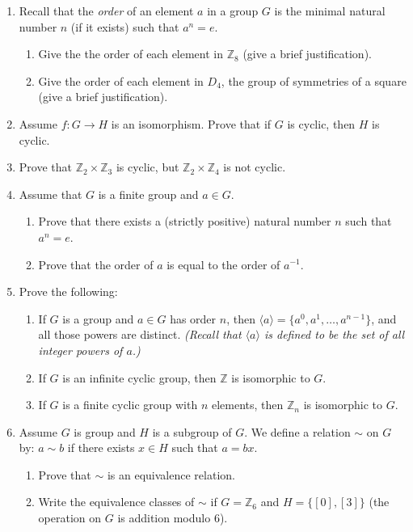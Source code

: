 \documentclass{amsart}
\theoremstyle{definition}
\begin{document}
\begin{enumerate}


\item Recall that the \emph{order} of an element $a$ in a group $G$ is the minimal natural number $n$ (if it exists) such that $a^n = e$.
  \begin{enumerate}
  \item Give the the order of each element in $\mathbb{Z}_{8}$ (give a brief justification).
  \item Give the order of each element in $D_4$, the group of symmetries of a square (give a brief justification).
  \end{enumerate}
\item Assume $f: G \to H$ is an isomorphism. Prove that if $G$ is cyclic, then $H$ is cyclic.
\item Prove that $\mathbb{Z}_2 \times \mathbb{Z}_3$ is cyclic, but $\mathbb{Z}_2 \times \mathbb{Z}_4$ is not cyclic.
\item Assume that $G$ is a finite group and $a \in G$.
  \begin{enumerate}
  \item Prove that there exists a (strictly positive) natural number $n$ such that $a^n = e$.
  \item Prove that the order of $a$ is equal to the order of $a^{-1}$.
  \end{enumerate}

\item Prove the following:

  \begin{enumerate}
  \item If $G$ is a group and $a \in G$ has order $n$, then $\langle a \rangle = \{a^0, a^1, \ldots, a^{n - 1}\}$, and all those powers are distinct. \emph{(Recall that $\langle a \rangle$ is defined to be the set of all integer powers of $a$.)}
  \item If $G$ is an infinite cyclic group, then $\mathbb{Z}$ is isomorphic to $G$.
  \item If $G$ is a finite cyclic group with $n$ elements, then $\mathbb{Z}_n$ is isomorphic to $G$.
  \end{enumerate}
\item Assume $G$ is group and $H$ is a subgroup of $G$. We define a relation $\sim$ on $G$ by: $a \sim b$ if there exists $x \in H$ such that $a = bx$.
  \begin{enumerate}
  \item Prove that $\sim$ is an equivalence relation.
  \item Write the equivalence classes of $\sim$ if $G = \mathbb{Z}_6$ and $H = \{[0], [3]\}$ (the operation on $G$ is addition modulo $6$).
  \end{enumerate}
\end{enumerate}




\end{document}
